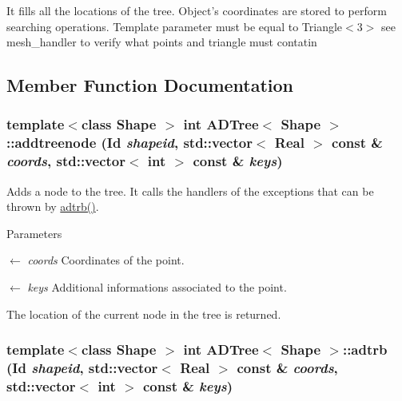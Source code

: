 It fills all the locations of the tree. Object's coordinates are stored to perform searching operations. Template parameter must be equal to Triangle$<$3$>$ see mesh\_\-handler to verify what points and triangle must contatin 

\subsection{Member Function Documentation}
\hypertarget{classADTree_a4210646b297dd9b48c273ff2923a2b59}{
\subsubsection[{addtreenode}]{\setlength{\rightskip}{0pt plus 5cm}template$<$class Shape $>$ int {\bf ADTree}$<$ Shape $>$::addtreenode (Id {\em shapeid}, \/  std::vector$<$ Real $>$ const \& {\em coords}, \/  std::vector$<$ int $>$ const \& {\em keys})}}
\label{classADTree_a4210646b297dd9b48c273ff2923a2b59}
Adds a node to the tree. It calls the handlers of the exceptions that can be thrown by \hyperlink{classADTree_a813a21f8aa0566f8ec70bcef2c4cc748}{adtrb()}.


\begin{DoxyParams}{Parameters}
\item[\mbox{$\leftarrow$} {\em coords}]Coordinates of the point. \item[\mbox{$\leftarrow$} {\em keys}]Additional informations associated to the point.\end{DoxyParams}
The location of the current node in the tree is returned. \hypertarget{classADTree_a813a21f8aa0566f8ec70bcef2c4cc748}{
\subsubsection[{adtrb}]{\setlength{\rightskip}{0pt plus 5cm}template$<$class Shape $>$ int {\bf ADTree}$<$ Shape $>$::adtrb (Id {\em shapeid}, \/  std::vector$<$ Real $>$ const \& {\em coords}, \/  std::vector$<$ int $>$ const \& {\em keys})}}
\label{classADTree_a813a21f8aa0566f8ec70bcef2c4cc748}


